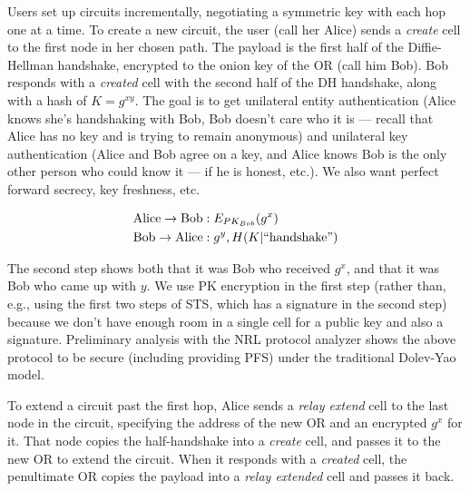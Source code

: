 \documentclass[times,10pt,twocolumn]{article}
\begin{document}
Users set up circuits incrementally, negotiating a symmetric key with
each hop one at a time. To create a new circuit, the user (call her
Alice) sends a \emph{create} cell to the first node in her chosen
path. The payload is the first half of the Diffie-Hellman handshake,
encrypted to the onion key of the OR (call him Bob). Bob responds with a
\emph{created} cell with the second half of the DH handshake, along with
a hash of $K=g^{xy}$. The goal is to get unilateral entity authentication
(Alice knows she's handshaking with Bob, Bob doesn't care who it is ---
recall that Alice has no key and is trying to remain anonymous) and
unilateral key authentication (Alice and Bob agree on a key, and Alice
knows Bob is the only other person who could know it --- if he is
honest, etc.). We also want perfect forward secrecy, key freshness, etc.

\begin{equation}
\begin{aligned}
\mathrm{Alice} \rightarrow \mathrm{Bob}&: E_{PK_{Bob}}(g^x) \\
\mathrm{Bob} \rightarrow \mathrm{Alice}&: g^y, H(K | \mathrm{``handshake"}) \\
\end{aligned}
\end{equation}

The second step shows both that it was Bob
who received $g^x$, and that it was Bob who came up with $y$. We use
PK encryption in the first step (rather than, e.g., using the first two
steps of STS, which has a signature in the second step) because we
don't have enough room in a single cell for a public key and also a
signature. Preliminary analysis with the NRL protocol analyzer shows
the above protocol to be secure (including providing PFS) under the
traditional Dolev-Yao model.

To extend a circuit past the first hop, Alice sends a \emph{relay extend}
cell to the last node in the circuit, specifying the address of the new
OR and an encrypted $g^x$ for it. That node copies the half-handshake
into a \emph{create} cell, and passes it to the new OR to extend the
circuit. When it responds with a \emph{created} cell, the penultimate OR
copies the payload into a \emph{relay extended} cell and passes it back.
\end{document}
